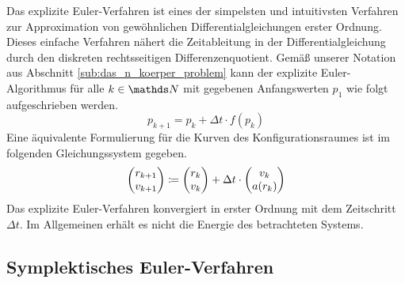     Das explizite Euler-Verfahren ist eines der simpelsten und intuitivsten Verfahren zur Approximation von gewöhnlichen Differentialgleichungen erster Ordnung.
    Dieses einfache Verfahren nähert die Zeitableitung in der Differentialgleichung durch den diskreten rechtsseitigen Differenzenquotient.
    Gemäß unserer Notation aus Abschnitt \ref{sub:das_n_koerper_problem} kann der explizite Euler-Algorithmus für alle $k \in \setNatural$ mit gegebenen Anfangswerten $p_1$ wie folgt aufgeschrieben werden.
    \[
      p_{k+1} = p_k + \Delta t \cdot f(p_k)
    \]
    Eine äquivalente Formulierung für die Kurven des Konfigurationsraumes ist im folgenden Gleichungssystem gegeben.
    \[
      \begin{pmatrix}
        r_{k+1} \\ v_{k+1}
      \end{pmatrix}
      \coloneqq
      \begin{pmatrix}
        r_k \\ v_k
      \end{pmatrix}
      + \Delta t \cdot
      \begin{pmatrix}
        v_k \\ a(r_k)
      \end{pmatrix}
    \]
    Das explizite Euler-Verfahren konvergiert in erster Ordnung mit dem Zeitschritt $\Delta t$.
    Im Allgemeinen erhält es nicht die Energie des betrachteten Systems.
    \medskip
    \begin{tcolorbox}[colframe=black,colbacktitle=white,coltitle=black, attach boxed title to top center={yshift=-2mm},enhanced, titlerule=0.1pt, boxrule=0.5pt, arc=5pt,title=Quelltext:\quad Expliziter Euler-Integrator, breakable]
      
    \end{tcolorbox}


  \subsection{Symplektisches Euler-Verfahren} %
  \label{sub:symplektisches_euler_verfahren}


